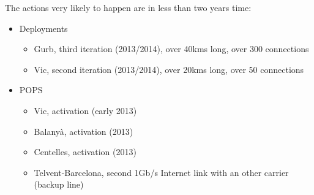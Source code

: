 The actions very likely to happen are in less than two years time:

\begin{itemize}
  \item Deployments
    \begin{itemize}
      \item Gurb, third iteration (2013/2014), over 40kms long, over 300 connections
    \end{itemize}
    \begin{itemize}
      \item Vic, second iteration (2013/2014), over 20kms long, over 50 connections
    \end{itemize}
  \item POPS
    \begin{itemize}
      \item Vic, activation (early 2013)
      \item Balany\`{a}, activation (2013)
      \item Centelles, activation (2013)
      \item Telvent-Barcelona, second 1Gb/s Internet link with an other carrier (backup line)
    \end{itemize}
\end{itemize}

